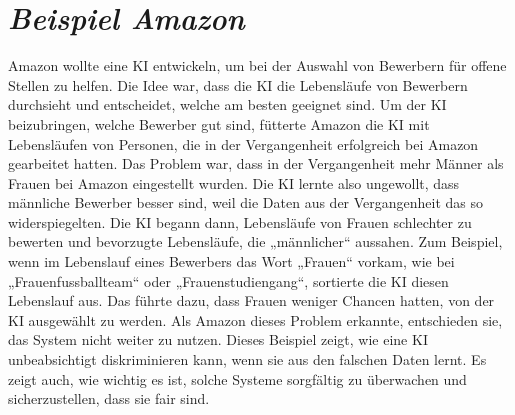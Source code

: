 \documentclass{article}
\begin{document}
\section{\textit{Beispiel Amazon}}
Amazon wollte eine KI entwickeln, um bei der Auswahl von Bewerbern für offene Stellen zu helfen. Die Idee war, dass die KI die Lebensläufe von Bewerbern durchsieht und entscheidet, welche am besten geeignet sind. Um der KI beizubringen, welche Bewerber gut sind, fütterte Amazon die KI mit Lebensläufen von Personen, die in der Vergangenheit erfolgreich bei Amazon gearbeitet hatten. Das Problem war, dass in der Vergangenheit mehr Männer als Frauen bei Amazon eingestellt wurden. Die KI lernte also ungewollt, dass männliche Bewerber besser sind, weil die Daten aus der Vergangenheit das so widerspiegelten. Die KI begann dann, Lebensläufe von Frauen schlechter zu bewerten und bevorzugte Lebensläufe, die „männlicher“ aussahen. Zum Beispiel, wenn im Lebenslauf eines Bewerbers das Wort „Frauen“ vorkam, wie bei „Frauenfussballteam“ oder „Frauenstudiengang“, sortierte die KI diesen Lebenslauf aus. Das führte dazu, dass Frauen weniger Chancen hatten, von der KI ausgewählt zu werden. Als Amazon dieses Problem erkannte, entschieden sie, das System nicht weiter zu nutzen. Dieses Beispiel zeigt, wie eine KI unbeabsichtigt diskriminieren kann, wenn sie aus den falschen Daten lernt. Es zeigt auch, wie wichtig es ist, solche Systeme sorgfältig zu überwachen und sicherzustellen, dass sie fair sind.



\nocite{*}
\printbibliography
\end{document}

